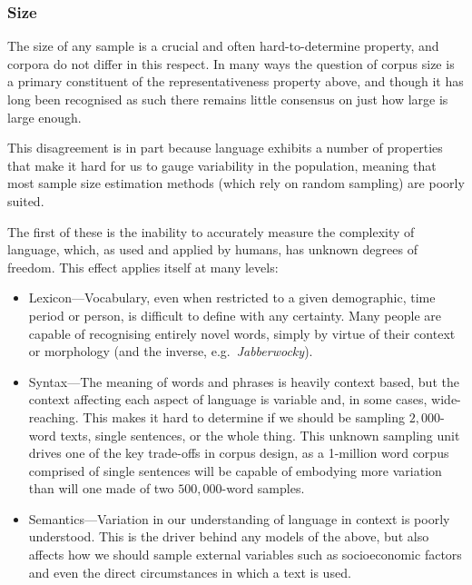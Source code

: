







\subsubsection{Size}

The size of any sample is a crucial and often hard-to-determine property, and corpora do not differ in this respect.  In many ways the question of corpus size is a primary constituent of the representativeness property above, and though it has long been recognised as such there remains little consensus on just how large is large enough.

This disagreement is in part because language exhibits a number of properties that make it hard for us to gauge variability in the population, meaning that most sample size estimation methods (which rely on random sampling) are poorly suited.


The first of these is the inability to accurately measure the complexity of language, which, as used and applied by humans, has unknown degrees of freedom.  This effect applies itself at many levels:

\begin{itemize}
    \item Lexicon---Vocabulary, even when restricted to a given demographic, time period or person, is difficult to define with any certainty.  Many people are capable of recognising entirely novel words, simply by virtue of their context or morphology (and the inverse, e.g.\ \textsl{Jabberwocky}).
    \item Syntax---The meaning of words and phrases is heavily context based, but the context affecting each aspect of language is variable and, in some cases, wide-reaching.  This makes it hard to determine if we should be sampling $2,000$-word texts, single sentences, or the whole thing\cite{hoey2005lexical}.  This unknown sampling unit drives one of the key trade-offs in corpus design, as a 1-million word corpus comprised of single sentences will be capable of embodying more variation than will one made of two $500,000$-word samples.
    \item Semantics---Variation in our understanding of language in context is poorly understood.  This is the driver behind any models of the above, but also affects how we should sample external variables such as socioeconomic factors and even the direct circumstances in which a text is used\cite{sinclair1991corpus,Stubbs19950101T0000000929998X23}. %
\end{itemize}

